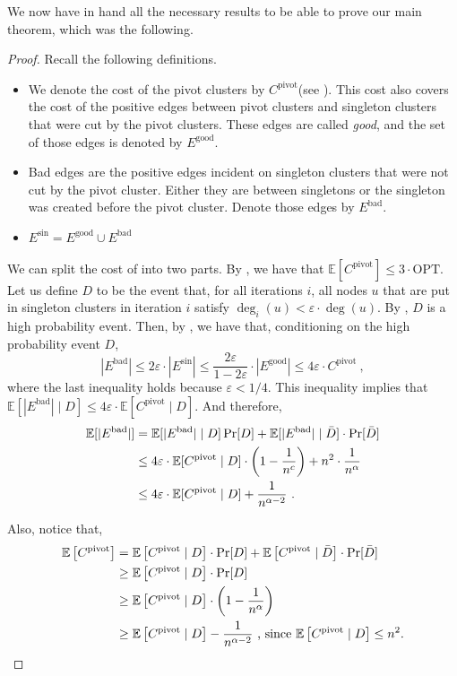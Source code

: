 \documentclass[10pt,a4paper]{article}
\newcommand{\E}{\mathbb{E}}
\newcommand{\eps}{\ensuremath{\varepsilon}}
\newcommand{\ourcluster}{\ensuremath{C^{\textrm{pivot}}}\xspace}
\newcommand{\opt}{\textrm{OPT}\xspace}
\newcommand{\badedges}{\ensuremath{E^{\textrm{bad}}}\xspace}
\newcommand{\goodedges}{\ensuremath{E^{\textrm{good}}}\xspace}
\newcommand{\singletonedges}{\ensuremath{E^{\textrm{sin}}}\xspace}
\begin{document}
We now have in hand all the necessary results to be able to prove our main theorem, which was the following. 

\maintheorem*
\begin{proof}
Recall the following definitions.
\begin{itemize}
    \item We denote the cost of the pivot clusters by \ourcluster (see ). This cost also covers the cost of the positive edges between pivot clusters and singleton clusters that were cut by the pivot clusters. These edges are called \emph{good}, and the set of those edges is denoted by \goodedges.
    \item Bad edges are the positive edges incident on singleton clusters that were not cut by the pivot cluster. Either they are between singletons or the singleton was created before the pivot cluster. Denote those edges by \badedges.
    \item $\singletonedges = \goodedges \cup \badedges$
\end{itemize}

We can split the cost of  into two parts.
By , we have that $\E[\ourcluster] \leq 3 \cdot \opt$. 
Let us define $D$ to be the event that, for all iterations $i$, all nodes $u$ that are put in singleton clusters in iteration $i$ satisfy $\deg_i(u) < \eps\cdot \deg(u)$. 
By , $D$ is a high probability event. 
Then, by , we have that, conditioning on the high probability event $D$,
\[
    |\badedges| \leq 2\eps \cdot |\singletonedges| \leq \frac{2\eps}{1-2\eps}\cdot |\goodedges| \leq 4\eps \cdot \ourcluster \ ,
\]
where the last inequality holds because $\eps < 1/4$. 
This inequality implies that $\mathbb{E}[|\badedges|\mid D] \leq 4\eps\cdot \mathbb{E}[\ourcluster\mid D]$. And therefore,
\begin{align*}
\mathbb{E}[|\badedges|] &= \mathbb{E}[|\badedges|\mid D]\Pr[D] + \mathbb{E}[|\badedges|\mid \Bar{D}]\cdot \Pr[\Bar{D}] \\
&\leq 4\eps\cdot \mathbb{E}[\ourcluster\mid D]\cdot \left(1-\frac{1}{n^c}\right) + n^2\cdot \frac{1}{n^\alpha} \\
&\leq 4\eps\cdot \mathbb{E}[\ourcluster\mid D] + \frac{1}{n^{\alpha-2}}  \ .
\end{align*}

Also, notice that,
 \begin{align*}
     \mathbb{E}\left[\ourcluster\right] &=  \mathbb{E}\left[\ourcluster\mid D \right]\cdot \Pr[D] + \mathbb{E}\left[\ourcluster\mid \Bar{D}\right]\cdot \Pr[\Bar{D}]\\
     &\geq \mathbb{E}\left[\ourcluster  \mid D \right]\cdot \Pr[D] \\
     &\geq \mathbb{E}\left[\ourcluster\mid D \right]\cdot \left( 1-\frac{1}{n^\alpha}\right)\\
     &\geq \mathbb{E}\left[\ourcluster\mid D \right] - \frac{1}{n^{\alpha-2}} \text{ , since }\mathbb{E}\left[\ourcluster\mid D \right] \leq n^2.
 \end{align*}
 

\end{proof}
\end{document}
